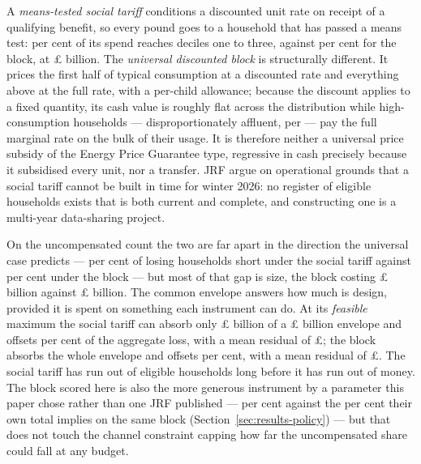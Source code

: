 A \emph{means-tested social tariff} conditions a discounted unit rate on receipt of a qualifying benefit, so every pound goes to a household that has passed a means test: \genSocialTariffShareBottomThree{} per cent of its spend reaches deciles one to three, against \genJrfShareBottomThree{} per cent for the block, at \pounds\genSocialTariffCostBn{} billion. The \emph{universal discounted block} is structurally different. It prices the first half of typical consumption at a discounted rate and everything above at the full rate, with a per-child allowance; because the discount applies to a fixed quantity, its cash value is roughly flat across the distribution while high-consumption households --- disproportionately affluent, per \citet{fetzer2024} --- pay the full marginal rate on the bulk of their usage. It is therefore neither a universal price subsidy of the Energy Price Guarantee type, regressive in cash precisely because it subsidised every unit, nor a transfer. JRF argue on operational grounds that a social tariff cannot be built in time for winter 2026: no register of eligible households exists that is both current and complete, and constructing one is a multi-year data-sharing project.

On the uncompensated count the two are far apart in the direction the universal case predicts --- \genSocialTariffUncompensatedShare{} per cent of losing households short under the social tariff against \genJrfUncompensatedShare{} per cent under the block --- but most of that gap is size, the block costing \pounds \genJrfCostBn{} billion against \pounds \genSocialTariffCostBn{} billion. The common envelope answers how much is design, provided it is spent on something each instrument can do. At its \emph{feasible} maximum the social tariff can absorb only \pounds \genSocialTariffAbsorbableBn{} billion of a \pounds \genEnvelopeBn{} billion envelope and offsets \genSocialTariffEnvelopeOffsetPct{} per cent of the aggregate loss, with a mean residual of \pounds \genSocialTariffEnvelopeResidualMeanGbp{}; the block absorbs the whole envelope and offsets \genJrfEnvelopeOffsetPct{} per cent, with a mean residual of \pounds \genJrfEnvelopeResidualMeanGbp{}. The social tariff has run out of eligible households long before it has run out of money. The block scored here is also the more generous instrument by a parameter this paper chose rather than one JRF published --- \genJrfModelledDiscountPct{} per cent against the \genJrfImpliedDiscountPct{} per cent their own total implies on the same block (Section~\ref{sec:results-policy}) --- but that does not touch the channel constraint capping how far the uncompensated share could fall at any budget.

